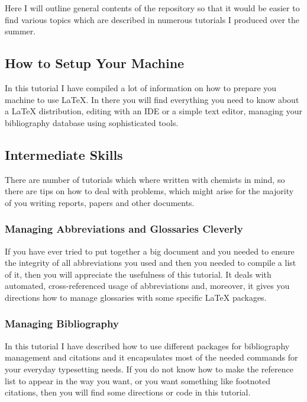 \documentclass[
    draft
    ]{scrartcl}
\begin{document}

%
Here I will outline general contents of the repository so that it would be
    easier to find various topics which are described in numerous tutorials I
    produced over the summer.

%
\subsection{How to Setup Your Machine}

%
In this tutorial I have compiled a lot of information on how to prepare you
    machine to use \LaTeX{}.
%
In there you will find everything you need to know about a \LaTeX{}
    distribution, editing with an IDE or a simple text editor, managing your
    bibliography database using sophisticated tools.

%
\subsection{Intermediate Skills}

%
There are number of tutorials which where written with chemists in mind, so
    there are tips on how to deal with problems, which might arise for the
    majority of you writing reports, papers and other documents.

%
\subsubsection{Managing Abbreviations and Glossaries Cleverly}

%
If you have ever tried to put together a big document and you needed to ensure
    the integrity of all abbreviations you used and then you needed to compile a
    list of it, then you will appreciate the usefulness of this tutorial.
%
It deals with automated, cross-referenced usage of abbreviations and, moreover,
    it gives you directions how to manage glossaries with some specific \LaTeX{}
    packages.

%
\subsubsection{Managing Bibliography}

%
In this tutorial I have described how to use different packages for bibliography
    management and citations and it encapsulates most of the needed commands for
    your everyday typesetting needs.
%
If you do not know how to make the reference list to appear in the way you want,
    or you want something like footnoted citations, then you will find some
    directions or code in this tutorial.
    
\end{document}
